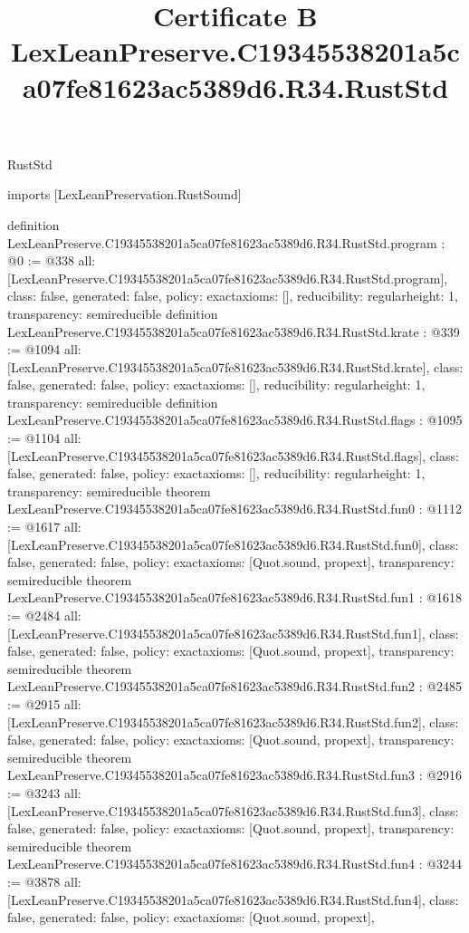 \begin{lexlean}{RustStd}
\title{Certificate B LexLeanPreserve.C19345538201a5ca07fe81623ac5389d6.R34.RustStd}
\begin{coremodule}
imports [LexLeanPreservation.RustSound]

definition LexLeanPreserve.C19345538201a5ca07fe81623ac5389d6.R34.RustStd.program : @0 := @338 {
  all: [LexLeanPreserve.C19345538201a5ca07fe81623ac5389d6.R34.RustStd.program],
  class: false,
  generated: false,
  policy: exact{axioms: []},
  reducibility: regular{height: 1},
  transparency: semireducible
}
definition LexLeanPreserve.C19345538201a5ca07fe81623ac5389d6.R34.RustStd.krate : @339 := @1094 {
  all: [LexLeanPreserve.C19345538201a5ca07fe81623ac5389d6.R34.RustStd.krate],
  class: false,
  generated: false,
  policy: exact{axioms: []},
  reducibility: regular{height: 1},
  transparency: semireducible
}
definition LexLeanPreserve.C19345538201a5ca07fe81623ac5389d6.R34.RustStd.flags : @1095 := @1104 {
  all: [LexLeanPreserve.C19345538201a5ca07fe81623ac5389d6.R34.RustStd.flags],
  class: false,
  generated: false,
  policy: exact{axioms: []},
  reducibility: regular{height: 1},
  transparency: semireducible
}
theorem LexLeanPreserve.C19345538201a5ca07fe81623ac5389d6.R34.RustStd.fun0 : @1112 := @1617 {
  all: [LexLeanPreserve.C19345538201a5ca07fe81623ac5389d6.R34.RustStd.fun0],
  class: false,
  generated: false,
  policy: exact{axioms: [Quot.sound, propext]},
  transparency: semireducible
}
theorem LexLeanPreserve.C19345538201a5ca07fe81623ac5389d6.R34.RustStd.fun1 : @1618 := @2484 {
  all: [LexLeanPreserve.C19345538201a5ca07fe81623ac5389d6.R34.RustStd.fun1],
  class: false,
  generated: false,
  policy: exact{axioms: [Quot.sound, propext]},
  transparency: semireducible
}
theorem LexLeanPreserve.C19345538201a5ca07fe81623ac5389d6.R34.RustStd.fun2 : @2485 := @2915 {
  all: [LexLeanPreserve.C19345538201a5ca07fe81623ac5389d6.R34.RustStd.fun2],
  class: false,
  generated: false,
  policy: exact{axioms: [Quot.sound, propext]},
  transparency: semireducible
}
theorem LexLeanPreserve.C19345538201a5ca07fe81623ac5389d6.R34.RustStd.fun3 : @2916 := @3243 {
  all: [LexLeanPreserve.C19345538201a5ca07fe81623ac5389d6.R34.RustStd.fun3],
  class: false,
  generated: false,
  policy: exact{axioms: [Quot.sound, propext]},
  transparency: semireducible
}
theorem LexLeanPreserve.C19345538201a5ca07fe81623ac5389d6.R34.RustStd.fun4 : @3244 := @3878 {
  all: [LexLeanPreserve.C19345538201a5ca07fe81623ac5389d6.R34.RustStd.fun4],
  class: false,
  generated: false,
  policy: exact{axioms: [Quot.sound, propext]},
}
\end{coremodule}
\end{lexlean}
